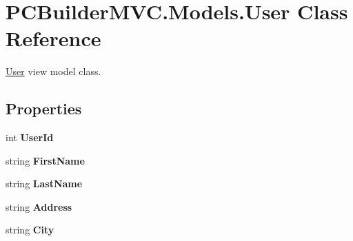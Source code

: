 \hypertarget{class_p_c_builder_m_v_c_1_1_models_1_1_user}{}\section{P\+C\+Builder\+M\+V\+C.\+Models.\+User Class Reference}
\label{class_p_c_builder_m_v_c_1_1_models_1_1_user}


\hyperlink{class_p_c_builder_m_v_c_1_1_models_1_1_user}{User} view model class.  


\subsection*{Properties}
\begin{DoxyCompactItemize}
\item 
int {\bfseries User\+Id}\hypertarget{class_p_c_builder_m_v_c_1_1_models_1_1_user_a5e64dcf76dc09943ccf7c6794e337279}{}\label{class_p_c_builder_m_v_c_1_1_models_1_1_user_a5e64dcf76dc09943ccf7c6794e337279}

\item 
string {\bfseries First\+Name}\hypertarget{class_p_c_builder_m_v_c_1_1_models_1_1_user_a390fa2a7b3c2c92751420eb4381531f5}{}\label{class_p_c_builder_m_v_c_1_1_models_1_1_user_a390fa2a7b3c2c92751420eb4381531f5}

\item 
string {\bfseries Last\+Name}\hypertarget{class_p_c_builder_m_v_c_1_1_models_1_1_user_a6afadce146ce780f16ec9e4c8f84b5c4}{}\label{class_p_c_builder_m_v_c_1_1_models_1_1_user_a6afadce146ce780f16ec9e4c8f84b5c4}

\item 
string {\bfseries Address}\hypertarget{class_p_c_builder_m_v_c_1_1_models_1_1_user_a33910f815ef59234cbcc27bf500e867d}{}\label{class_p_c_builder_m_v_c_1_1_models_1_1_user_a33910f815ef59234cbcc27bf500e867d}

\item 
string {\bfseries City}\hypertarget{class_p_c_builder_m_v_c_1_1_models_1_1_user_af8302db4cc634f8644c5ed07a270b34b}{}\label{class_p_c_builder_m_v_c_1_1_models_1_1_user_af8302db4cc634f8644c5ed07a270b34b}


\end{DoxyCompactItemize}
